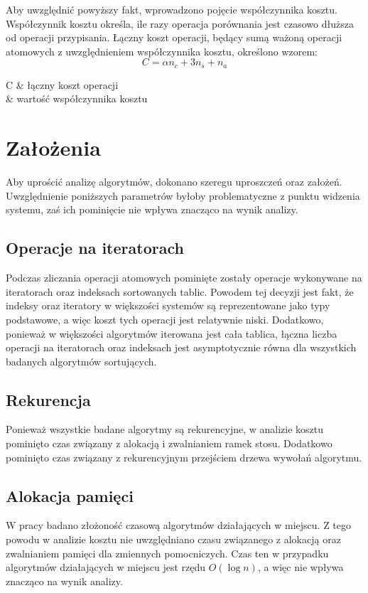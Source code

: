 Aby uwzględnić powyższy fakt, wprowadzono pojęcie współczynnika kosztu. Współczynnik kosztu określa, ile razy operacja porównania jest czasowo dłuższa od operacji przypisania. 
Łączny koszt operacji, będący sumą ważoną operacji atomowych z uwzględnieniem współczynnika kosztu, określono wzorem:\\

$$C = \alpha n_c + 3n_s + n_a $$

\begin{conditions}
	C		&  łączny koszt operacji 			\\
	\alpha	&  wartość współczynnika kosztu 	\\   
\end{conditions}

\section{Założenia}
Aby uprościć analizę algorytmów, dokonano szeregu uproszczeń oraz założeń. Uwzględnienie poniższych parametrów byłoby problematyczne z punktu widzenia systemu, zaś ich pominięcie nie wpływa znacząco na wynik analizy.\\

\subsection{Operacje na iteratorach}
Podczas zliczania operacji atomowych pominięte zostały operacje wykonywane na iteratorach oraz indeksach sortowanych tablic.
Powodem tej decyzji jest fakt, że indeksy oraz iteratory w większości systemów są reprezentowane jako typy podstawowe,
a więc koszt tych operacji jest relatywnie niski. Dodatkowo, ponieważ w większości algorytmów iterowana jest cała tablica, łączna liczba operacji na iteratorach oraz indeksach jest asymptotycznie równa dla wszystkich badanych algorytmów sortujących.\\

\subsection{Rekurencja}
Ponieważ wszystkie badane algorytmy są rekurencyjne, w analizie kosztu pominięto czas związany z alokacją i zwalnianiem ramek stosu. Dodatkowo pominięto czas związany z rekurencyjnym przejściem drzewa wywołań algorytmu.\\

\subsection{Alokacja pamięci}
W pracy badano złożoność czasową algorytmów działających w miejscu. Z tego powodu w analizie kosztu nie uwzględniano czasu związanego z alokacją oraz zwalnianiem pamięci dla zmiennych pomocniczych. Czas ten w przypadku algorytmów działających w miejscu jest rzędu $O(\log{n})$, a więc nie wpływa znacząco na wynik analizy.\\

